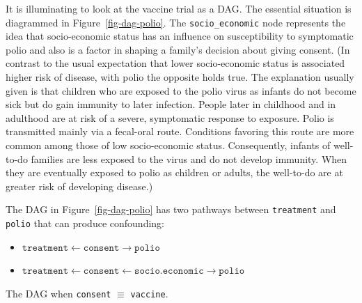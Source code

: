 \documentclass[
  letterpaper,
  DIV=11,
  numbers=noendperiod,
  oneside]{scrartcl}
\providecommand{\tightlist}{%
  \setlength{\itemsep}{0pt}\setlength{\parskip}{0pt}}\usepackage{longtable,booktabs,array}
\begin{document}
It is illuminating to look at the vaccine trial as a DAG. The essential
situation is diagrammed in Figure~\ref{fig-dag-polio}. The
\texttt{socio\_economic} node represents the idea that socio-economic
status has an influence on susceptibility to symptomatic polio and also
is a factor in shaping a family's decision about giving consent. (In
contrast to the usual expectation that lower socio-economic status is
associated higher risk of disease, with polio the opposite holds true.
The explanation usually given is that children who are exposed to the
polio virus as infants do not become sick but do gain immunity to later
infection. People later in childhood and in adulthood are at risk of a
severe, symptomatic response to exposure. Polio is transmitted mainly
via a fecal-oral route. Conditions favoring this route are more common
among those of low socio-economic status. Consequently, infants of
well-to-do families are less exposed to the virus and do not develop
immunity. When they are eventually exposed to polio as children or
adults, the well-to-do are at greater risk of developing disease.)

The DAG in Figure~\ref{fig-dag-polio} has two pathways between
\texttt{treatment} and \texttt{polio} that can produce confounding:

\begin{itemize}
\tightlist
\item
  \(\mathtt{treatment} \leftarrow \mathtt{consent} \rightarrow \mathtt{polio}\)
\item
  \(\mathtt{treatment} \leftarrow \mathtt{consent} \leftarrow \mathtt{socio.economic} \rightarrow \mathtt{polio}\)
\end{itemize}

\begin{marginfigure}


\caption{\label{fig-dag-polio-consent}The DAG when \texttt{consent}
\(\equiv\) \texttt{vaccine}.}

\end{marginfigure}%
\end{document}
